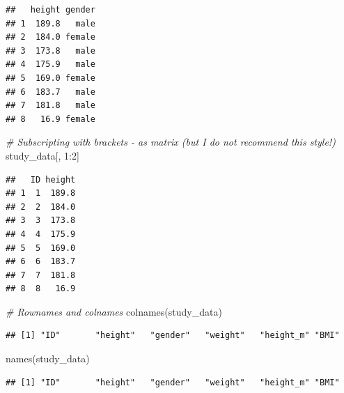 \documentclass[
]{book}
\newenvironment{Shaded}{\begin{snugshade}}{\end{snugshade}}
\newcommand{\CommentTok}[1]{\textcolor[rgb]{0.56,0.35,0.01}{\textit{#1}}}
\newcommand{\ConstantTok}[1]{\textcolor[rgb]{0.00,0.00,0.00}{#1}}
\newcommand{\DecValTok}[1]{\textcolor[rgb]{0.00,0.00,0.81}{#1}}
\newcommand{\FloatTok}[1]{\textcolor[rgb]{0.00,0.00,0.81}{#1}}
\newcommand{\FunctionTok}[1]{\textcolor[rgb]{0.00,0.00,0.00}{#1}}
\newcommand{\NormalTok}[1]{#1}
\newcommand{\OtherTok}[1]{\textcolor[rgb]{0.56,0.35,0.01}{#1}}
\newcommand{\SpecialCharTok}[1]{\textcolor[rgb]{0.00,0.00,0.00}{#1}}
\begin{document}
\begin{verbatim}
##   height gender
## 1  189.8   male
## 2  184.0 female
## 3  173.8   male
## 4  175.9   male
## 5  169.0 female
## 6  183.7   male
## 7  181.8   male
## 8   16.9 female
\end{verbatim}

\begin{Shaded}
\begin{Highlighting}[]
\CommentTok{\# Subscripting with brackets {-} as matrix (but I do not recommend this style!)}
\NormalTok{study\_data[, }\DecValTok{1}\SpecialCharTok{:}\DecValTok{2}\NormalTok{]}
\end{Highlighting}
\end{Shaded}

\begin{verbatim}
##   ID height
## 1  1  189.8
## 2  2  184.0
## 3  3  173.8
## 4  4  175.9
## 5  5  169.0
## 6  6  183.7
## 7  7  181.8
## 8  8   16.9
\end{verbatim}

\begin{Shaded}
\begin{Highlighting}[]
\CommentTok{\# Rownames and colnames}
\FunctionTok{colnames}\NormalTok{(study\_data)}
\end{Highlighting}
\end{Shaded}

\begin{verbatim}
## [1] "ID"       "height"   "gender"   "weight"   "height_m" "BMI"
\end{verbatim}

\begin{Shaded}
\begin{Highlighting}[]
\FunctionTok{names}\NormalTok{(study\_data)}
\end{Highlighting}
\end{Shaded}

\begin{verbatim}
## [1] "ID"       "height"   "gender"   "weight"   "height_m" "BMI"
\end{verbatim}

\begin{Shaded}
\end{Shaded}
\end{document}
